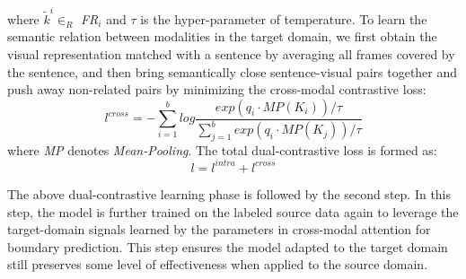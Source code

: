 \documentclass[runningheads]{llncs}
\begin{document}
where $\tilde{k}^i$$\in_R$ \textit{FR}$_i$ and $\tau$ is the hyper-parameter of temperature. To learn the semantic relation between modalities in the target domain, we first obtain the visual representation matched with a sentence by averaging all frames covered by the sentence, and then bring semantically close sentence-visual pairs together and push away non-related pairs by minimizing the cross-modal contrastive loss:
\vspace{-3 mm}
\begin{equation}
    l^{cross} = -\sum_{i=1}^b log\frac{exp(q_i \cdot \textit{MP}(K_i))/\tau}{\sum_{j=1}^b exp(q_i \cdot \textit{MP}(K_j))/\tau} \label{eq:6}
\end{equation}
where \textit{MP} denotes \textit{Mean-Pooling}. The total dual-contrastive loss is formed as:
\begin{equation}
    l = l^{intra} + l^{cross} \label{eq:7}
\end{equation}

\noindent
The above dual-contrastive learning phase is followed by the second step. 
In this step, the model is further trained on the labeled source data again to leverage the target-domain signals learned by the parameters in cross-modal attention for boundary prediction. This step ensures the model adapted to the target domain still preserves some level of effectiveness when applied to the source domain. 
\end{document}
